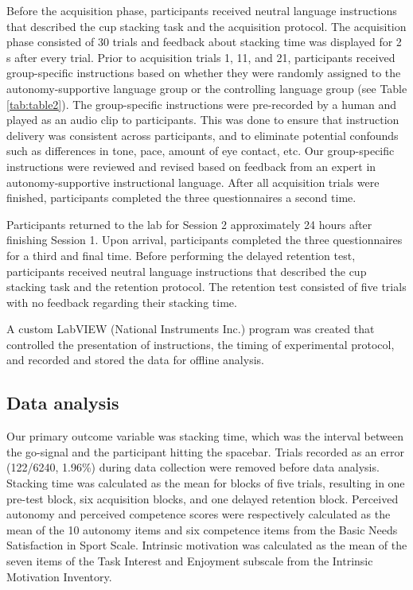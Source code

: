 \documentclass[doc,floatsintext,donotrepeattitle,letterpaper,12pt]{apa7}
\begin{document}
Before the acquisition phase, participants received neutral language instructions that described the cup stacking task and the acquisition protocol. The acquisition phase consisted of 30 trials and feedback about stacking time was displayed for 2 s after every trial. Prior to acquisition trials 1, 11, and 21, participants received group-specific instructions based on whether they were randomly assigned to the autonomy-supportive language group or the controlling language group (see Table \ref{tab:table2}). The group-specific instructions were pre-recorded by a human and played as an audio clip to participants. This was done to ensure that instruction delivery was consistent across participants, and to eliminate potential confounds such as differences in tone, pace, amount of eye contact, etc. Our group-specific instructions were reviewed and revised based on feedback from an expert in autonomy-supportive instructional language.\footnotemark{} After all acquisition trials were finished, participants completed the three questionnaires a second time.

Participants returned to the lab for Session 2 approximately 24 hours after finishing Session 1. Upon arrival, participants completed the three questionnaires for a third and final time. Before performing the delayed retention test, participants received neutral language instructions that described the cup stacking task and the retention protocol. The retention test consisted of five trials with no feedback regarding their stacking time.

A custom LabVIEW (National Instruments Inc.) program was created that controlled the presentation of instructions, the timing of experimental protocol, and recorded and stored the data for offline analysis.

\subsection{Data analysis}

Our primary outcome variable was stacking time, which was the interval between the go-signal and the participant hitting the spacebar. Trials recorded as an error (122/6240, 1.96\%) during data collection were removed before data analysis. Stacking time was calculated as the mean for blocks of five trials, resulting in one pre-test block, six acquisition blocks, and one delayed retention block. Perceived autonomy and perceived competence scores were respectively calculated as the mean of the 10 autonomy items and six competence items from the Basic Needs Satisfaction in Sport Scale. Intrinsic motivation was calculated as the mean of the seven items of the Task Interest and Enjoyment subscale from the Intrinsic Motivation Inventory.
\end{document}
